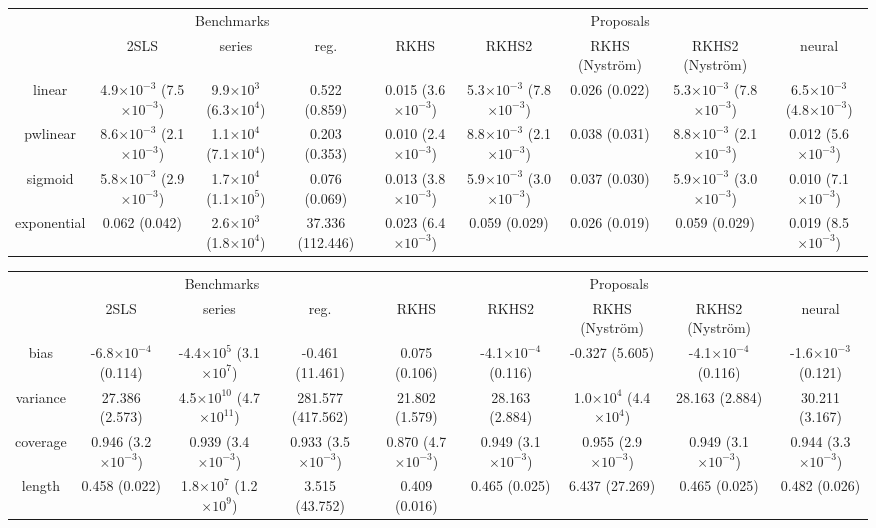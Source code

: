 \begin{tabular}{ccccccccc}
    & \multicolumn{3}{c}{Benchmarks} & \multicolumn{5}{c}{Proposals} \tabularnewline
    \cmidrule(lr){2-4}\cmidrule(lr){5-9}
     & 2SLS & series & reg. & RKHS & RKHS2 & RKHS (Nyström) & RKHS2 (Nyström) & neural \tabularnewline
    \hline
    linear & 4.9$\times 10^{-3}$ (7.5$\times 10^{-3}$) & 9.9$\times 10^{3}$ (6.3$\times 10^{4}$) & 0.522 (0.859) & 0.015 (3.6$\times 10^{-3}$) & 5.3$\times 10^{-3}$ (7.8$\times 10^{-3}$) & 0.026 (0.022) & 5.3$\times 10^{-3}$ (7.8$\times 10^{-3}$) & 6.5$\times 10^{-3}$ (4.8$\times 10^{-3}$) \tabularnewline
    pwlinear & 8.6$\times 10^{-3}$ (2.1$\times 10^{-3}$) & 1.1$\times 10^{4}$ (7.1$\times 10^{4}$) & 0.203 (0.353) & 0.010 (2.4$\times 10^{-3}$) & 8.8$\times 10^{-3}$ (2.1$\times 10^{-3}$) & 0.038 (0.031) & 8.8$\times 10^{-3}$ (2.1$\times 10^{-3}$) & 0.012 (5.6$\times 10^{-3}$) \tabularnewline
    sigmoid & 5.8$\times 10^{-3}$ (2.9$\times 10^{-3}$) & 1.7$\times 10^{4}$ (1.1$\times 10^{5}$) & 0.076 (0.069) & 0.013 (3.8$\times 10^{-3}$) & 5.9$\times 10^{-3}$ (3.0$\times 10^{-3}$) & 0.037 (0.030) & 5.9$\times 10^{-3}$ (3.0$\times 10^{-3}$) & 0.010 (7.1$\times 10^{-3}$) \tabularnewline
    exponential & 0.062 (0.042) & 2.6$\times 10^{3}$ (1.8$\times 10^{4}$) & 37.336 (112.446) & 0.023 (6.4$\times 10^{-3}$) & 0.059 (0.029) & 0.026 (0.019) & 0.059 (0.029) & 0.019 (8.5$\times 10^{-3}$) \tabularnewline
    \hline
\end{tabular}

\begin{tabular}{ccccccccc}
    & \multicolumn{3}{c}{Benchmarks} & \multicolumn{5}{c}{Proposals} \tabularnewline
    \cmidrule(lr){2-4}\cmidrule(lr){5-9}
     & 2SLS & series & reg. & RKHS & RKHS2 & RKHS (Nyström) & RKHS2 (Nyström) & neural \tabularnewline
    \hline
    bias & -6.8$\times 10^{-4}$ (0.114) & -4.4$\times 10^{5}$ (3.1$\times 10^{7}$) & -0.461 (11.461) & 0.075 (0.106) & -4.1$\times 10^{-4}$ (0.116) & -0.327 (5.605) & -4.1$\times 10^{-4}$ (0.116) & -1.6$\times 10^{-3}$ (0.121) \tabularnewline
    variance & 27.386 (2.573) & 4.5$\times 10^{10}$ (4.7$\times 10^{11}$) & 281.577 (417.562) & 21.802 (1.579) & 28.163 (2.884) & 1.0$\times 10^{4}$ (4.4$\times 10^{4}$) & 28.163 (2.884) & 30.211 (3.167) \tabularnewline
    coverage & 0.946 (3.2$\times 10^{-3}$) & 0.939 (3.4$\times 10^{-3}$) & 0.933 (3.5$\times 10^{-3}$) & 0.870 (4.7$\times 10^{-3}$) & 0.949 (3.1$\times 10^{-3}$) & 0.955 (2.9$\times 10^{-3}$) & 0.949 (3.1$\times 10^{-3}$) & 0.944 (3.3$\times 10^{-3}$) \tabularnewline
    length & 0.458 (0.022) & 1.8$\times 10^{7}$ (1.2$\times 10^{9}$) & 3.515 (43.752) & 0.409 (0.016) & 0.465 (0.025) & 6.437 (27.269) & 0.465 (0.025) & 0.482 (0.026) \tabularnewline
    \hline
\end{tabular}

